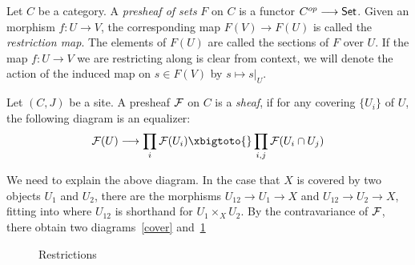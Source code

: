 \begin{definition}[Presheaves] 
  Let $C$ be a category. A \textit{presheaf of sets} $F$ on $C$ is a functor $C^{op} \longrightarrow \mathsf{Set}$. Given an morphism $f: U \to V$, the corresponding map $F(V) \to F(U)$ is called the \textit{restriction map}. The elements of $F(U)$ are called the sections of $F$ over $U$. If the map $f: U \to V$ we are restricting along is clear from context, we will denote the action of the induced map on $s \in F(V)$ by $s \mapsto s|_U$.
\end{definition}

\begin{definition}[Sheaves]
  Let $(C,J)$ be a site.  A presheaf $\mathcal{F}$ on $C$ is a \textit{sheaf}, if for any covering $\{U_i\}$ of $U$, the following diagram is an equalizer:
  \begin{equation} \label{equalizer:1}
    \Sh{F}(U) \to \prod_{i} \Sh{F}(U_i) \xbigtoto{} \prod_{i,j} \Sh{F}(U_i \cap U_j)
  \end{equation}
\end{definition}

We need to explain the above diagram. In the case that $X$ is covered by two objects $U_1$ and $U_2$, there are the morphisms $U_{12} \to U_1 \to X$ and $U_{12} \to U_2 \to X$, fitting into  where $U_{12}$ is shorthand for $U_1 \times_X U_2$. By the contravariance of $\mathcal{F}$, there obtain two diagrams~\ref{cover} and~\ref{restriction}

\begin{figure}[h!]
    \tikzset{column sep=small, ampersand replacement=\&}
	\begin{floatrow}
    \centering

     {\caption{Restrictions}\label{restriction}}
    \end{floatrow}
    \tikzset{column sep=small, ampersand replacement=&}
\end{figure}

